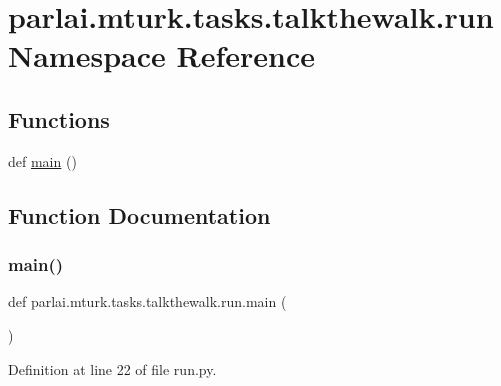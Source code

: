 \hypertarget{namespaceparlai_1_1mturk_1_1tasks_1_1talkthewalk_1_1run}{}\section{parlai.\+mturk.\+tasks.\+talkthewalk.\+run Namespace Reference}
\label{namespaceparlai_1_1mturk_1_1tasks_1_1talkthewalk_1_1run}
\subsection*{Functions}
\begin{DoxyCompactItemize}
\item 
def \hyperlink{namespaceparlai_1_1mturk_1_1tasks_1_1talkthewalk_1_1run_aa3dad7cff29347fafebfb3c91efee8cd}{main} ()
\end{DoxyCompactItemize}


\subsection{Function Documentation}
\mbox{\label{namespaceparlai_1_1mturk_1_1tasks_1_1talkthewalk_1_1run_aa3dad7cff29347fafebfb3c91efee8cd}} 
\subsubsection{\texorpdfstring{main()}{main()}}
{\footnotesize\ttfamily def parlai.\+mturk.\+tasks.\+talkthewalk.\+run.\+main (\begin{DoxyParamCaption}{ }\end{DoxyParamCaption})}



Definition at line 22 of file run.\+py.

